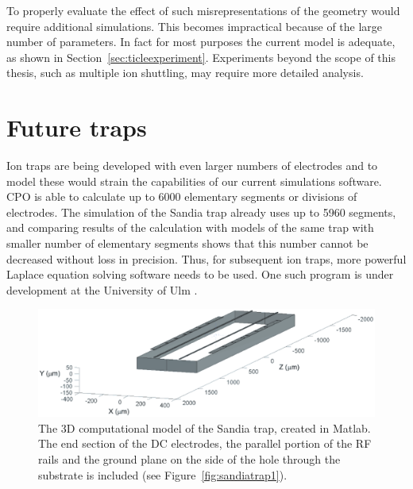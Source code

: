 To properly evaluate the effect of such misrepresentations of the geometry would require additional simulations. This becomes impractical because of the large number of parameters. In fact for most purposes the current model is adequate, as shown in Section~\ref{sec:ticleexperiment}. Experiments beyond the scope of this thesis, such as multiple ion shuttling, may require more detailed analysis.


%


\section{Future traps}

Ion traps are being developed with even larger numbers of electrodes and to model these would strain the capabilities of our current simulations software. CPO is able to calculate up to 6000 elementary segments or divisions of electrodes. The simulation of the Sandia trap already uses up to 5960 segments, and comparing results of the calculation with models of the same trap with smaller number of elementary segments shows that this number cannot be decreased without loss in precision. Thus, for subsequent ion traps, more powerful Laplace equation solving software needs to be used. One such program is under development at the University of Ulm \cite{Huber2008}.

\begin{figure}[h!t]
\centering
\includegraphics[width=14cm]{chapter2/sandia3d_v4}
\caption[Computational model of the Sandia trap]{The 3D computational model of the Sandia trap, created in Matlab. The end section of the DC electrodes, the parallel portion of the RF rails and the ground plane on the side of the hole through the substrate is included (see Figure~\ref{fig:sandiatrap1}). }
\label{fig:sandia3d}
\end{figure} 

